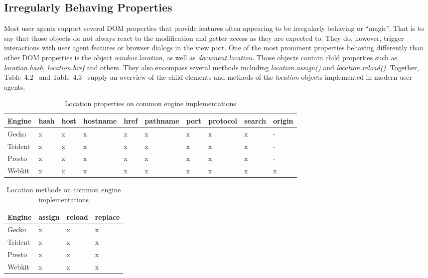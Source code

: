     \subsection{Irregularly Behaving Properties}
    \label{subsubsec:6.2.6.magic_properties}

    Most user agents support several DOM properties that provide features often appearing to be irregularly behaving or ``magic''. That is to say that those objects do not always react to the modification and getter access as they are expected to. They do, however, trigger interactions with user agent features or browser dialogs in the view port. One of the most prominent properties behaving differently than other DOM properties is the object \textit{window.location}, as well as \textit{document.location}. Those objects contain child properties such as \textit{location.hash}, \textit{location.href} and others. They also encompass several methods including \textit{location.assign()} and \textit{location.reload()}. Together, Table~4.2~%
 and Table~4.3~%
 supply an overview of the child elements and methods of the \textit{location} objects implemented in modern user agents. \\

\begin{table}
  \centering
    \begin{tabular}{| l | l | l | l | l | l | l | l | l | l |}
    \hline
    Engine & hash & host & hostname & href & pathname & port & protocol & search & origin  \\ \hline
    Gecko  & x & x & x & x & x & x & x & x & - \\ \hline
    Trident & x & x & x & x & x & x & x & x & - \\ \hline
    Presto & x & x & x & x & x & x & x & x & - \\ \hline
    Webkit & x & x & x & x & x & x & x & x & x \\ \hline
    \end{tabular}
    \label{tbl:location-properties}
    \caption{Location properties on common engine implementations}
\end{table}

\begin{table}
  \centering
    \begin{tabular}{| l | l | l | l |}
    \hline
    Engine & assign & reload & replace  \\ \hline
    Gecko  & x & x & x  \\ \hline
    Trident & x & x & x  \\ \hline
    Presto & x & x & x  \\ \hline
    Webkit & x & x & x  \\ \hline
    \end{tabular}
    \label{tbl:location-methods}
    \caption{Location methods on common engine implementations}
\end{table}

